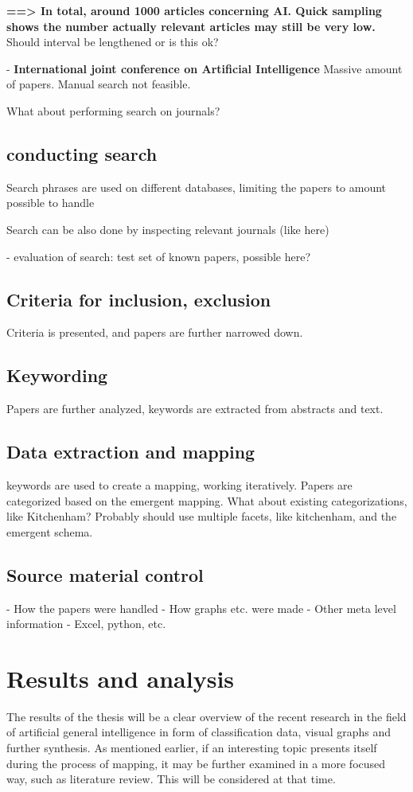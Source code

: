\documentclass[utf8,english]{gradu3}
\begin{document}
  \textbf{==> In total, around 1000 articles concerning AI. Quick sampling shows
  the number actually relevant articles may still be very low.} Should interval
  be lengthened or is this ok?

- \textbf{International joint conference on Artificial Intelligence}
  Massive amount of papers. Manual search not feasible.

  What about performing search on journals? 


  

\section{conducting search}
Search phrases are used on different databases, limiting the papers to amount
possible to handle

Search can be also done by inspecting relevant journals (like here)

- evaluation of search: test set of known papers, possible here?

\section{Criteria for inclusion, exclusion}
Criteria is presented, and papers are further narrowed down.

\section{Keywording}
Papers are further analyzed, keywords are extracted from abstracts and text. 

\section{Data extraction and mapping}
keywords are used to create a mapping, working iteratively. Papers are
categorized based on the emergent mapping. What about existing categorizations,
like Kitchenham? Probably should use multiple facets, like kitchenham, and the
emergent schema.

\section{Source material control}
- How the papers were handled
- How graphs etc. were made
- Other meta level information
- Excel, python, etc.

\chapter{Results and analysis}
The results of the thesis will be a clear overview of the recent research in the
field of artificial general intelligence in form of classification data, visual
graphs and further synthesis. As mentioned earlier, if an interesting topic
presents itself during the process of mapping, it may be further examined in a
more focused way, such as literature review. This will be considered at that
time.
\end{document}
